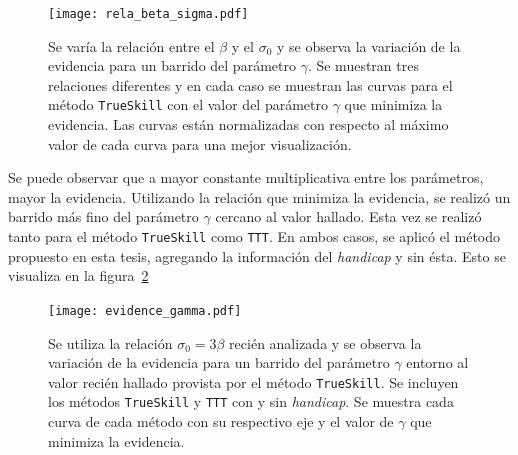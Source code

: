 \documentclass[11pt,twoside, spanish]{report} %
\begin{document}
\begin{figure}[H]
	\centering
	\texttt{[image: rela\_beta\_sigma.pdf]}
	\caption{Se var\'ia la relaci\'on entre el $\beta$ y el $\sigma_0$ y se observa la variaci\'on de la evidencia para un barrido del par\'ametro $\gamma$. Se muestran tres relaciones diferentes y en cada caso se muestran las curvas para el m\'etodo \texttt{TrueSkill} con el valor del par\'ametro $\gamma$ que  minimiza la evidencia. Las curvas est\'an normalizadas con respecto al m\'aximo valor de cada curva para una mejor visualizaci\'on.}
	\label{fig:relaBetaSigma}
\end{figure}


Se puede observar que a mayor constante multiplicativa entre los par\'ametros, mayor la evidencia.
Utilizando la relaci\'on que minimiza la evidencia, se realiz\'o un barrido m\'as fino del par\'ametro $\gamma$   \hspace{0.5mm} cercano al valor hallado.
Esta vez se realiz\'o tanto para el m\'etodo \texttt{TrueSkill} como \texttt{TTT}.
En ambos casos, se aplic\'o el m\'etodo propuesto en esta tesis, agregando la informaci\'on del \textit{handicap} y sin \'esta.
Esto se visualiza en la figura~\ref{fig:tttBetaSigma}

\begin{figure}[H]
	\centering
	\texttt{[image: evidence\_gamma.pdf]}
	\caption{Se utiliza la relaci\'on   $\sigma_0 = 3 \beta$ reci\'en analizada y se observa la variaci\'on de la evidencia para un barrido del par\'ametro $\gamma$ entorno al valor reci\'en hallado provista por el m\'etodo \texttt{TrueSkill}. Se incluyen los m\'etodos \texttt{TrueSkill} y \texttt{TTT} con y sin \textit{handicap}. Se muestra cada curva de cada m\'etodo con su respectivo eje y el valor de $\gamma$ que minimiza la evidencia.}
	\label{fig:tttBetaSigma}
\end{figure}
\end{document}
